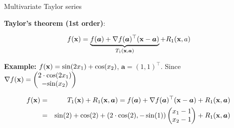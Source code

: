 \begin{vbframe}{Multivariate Taylor series}

\textbf{Taylor's theorem (1st order)}: 

$$
  f(\mathbf{x}) = \underbrace{f(\bm{a}) + \nabla f(\bm{a})^\top (\mathbf{x} - \bm{a})}_{T_1(\mathbf{x}, \bm{a})} + R_1(\mathbf{x}, a) 
$$

\vspace*{-0.3cm}

\begin{footnotesize} \textbf{Example: } $f(\mathbf{x}) = \text{sin}(2x_1) + \text{cos}(x_2)$, $\bm{a} = (1, 1)^\top$. Since $\nabla f(\mathbf{x}) = \begin{pmatrix} 2\cdot\text{cos}(2x_1) \\ -\text{sin}(x_2) \end{pmatrix}$

\vspace*{-0.3cm}

\begin{eqnarray*}
  f(\mathbf{x}) &=& T_1(\mathbf{x}) + R_1(\mathbf{x}, \bm{a}) = f(\bm{a}) + \nabla f(\bm{a})^\top (\mathbf{x} - \bm{a}) + R_1(\mathbf{x}, \bm{a})\\ &=& \sin(2) + \cos(2) + (2 \cdot \cos(2), - \sin(1))\begin{pmatrix} x_1 - 1 \\ x_2 - 1\end{pmatrix} + R_1(\mathbf{x}, \bm{a})
\end{eqnarray*}

\end{footnotesize}

\vspace*{-0.3cm}


\end{vbframe}
